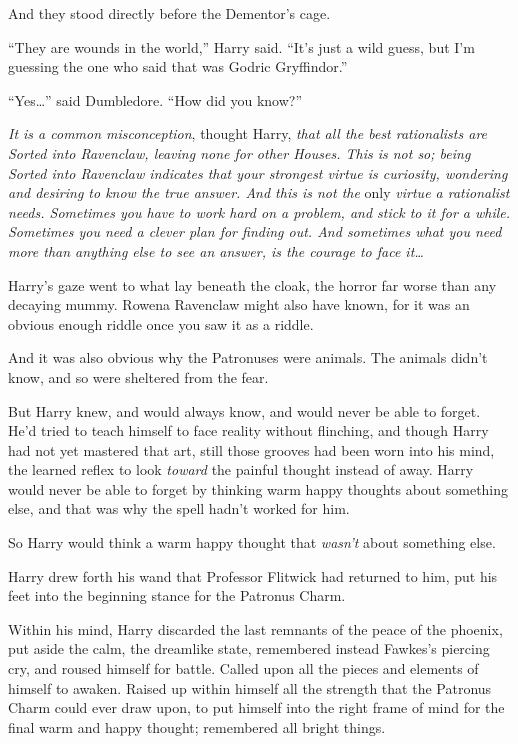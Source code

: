 And they stood directly before the Dementor's cage.

``They are wounds in the world,'' Harry said. ``It's just a wild guess,
but I'm guessing the one who said that was Godric Gryffindor.''

``Yes\ldots{}'' said Dumbledore. ``How did you know?''

\emph{It is a common misconception}, thought Harry, \emph{that all the
best rationalists are Sorted into Ravenclaw, leaving none for other
Houses. This is not so; being Sorted into Ravenclaw indicates that your
strongest virtue is curiosity, wondering and desiring to know the true
answer. And this is not the} only \emph{virtue a rationalist needs.
Sometimes you have to work hard on a problem, and stick to it for a
while. Sometimes you need a clever plan for finding out. And sometimes
what you need more than anything else to see an answer, is the courage
to face it\ldots{}}

Harry's gaze went to what lay beneath the cloak, the horror far worse
than any decaying mummy. Rowena Ravenclaw might also have known, for it
was an obvious enough riddle once you saw it as a riddle.

And it was also obvious why the Patronuses were animals. The animals
didn't know, and so were sheltered from the fear.

But Harry knew, and would always know, and would never be able to
forget. He'd tried to teach himself to face reality without flinching,
and though Harry had not yet mastered that art, still those grooves had
been worn into his mind, the learned reflex to look \emph{toward} the
painful thought instead of away. Harry would never be able to forget by
thinking warm happy thoughts about something else, and that was why the
spell hadn't worked for him.

So Harry would think a warm happy thought that \emph{wasn't} about
something else.

Harry drew forth his wand that Professor Flitwick had returned to him,
put his feet into the beginning stance for the Patronus Charm.

Within his mind, Harry discarded the last remnants of the peace of the
phoenix, put aside the calm, the dreamlike state, remembered instead
Fawkes's piercing cry, and roused himself for battle. Called upon all
the pieces and elements of himself to awaken. Raised up within himself
all the strength that the Patronus Charm could ever draw upon, to put
himself into the right frame of mind for the final warm and happy
thought; remembered all bright things.

